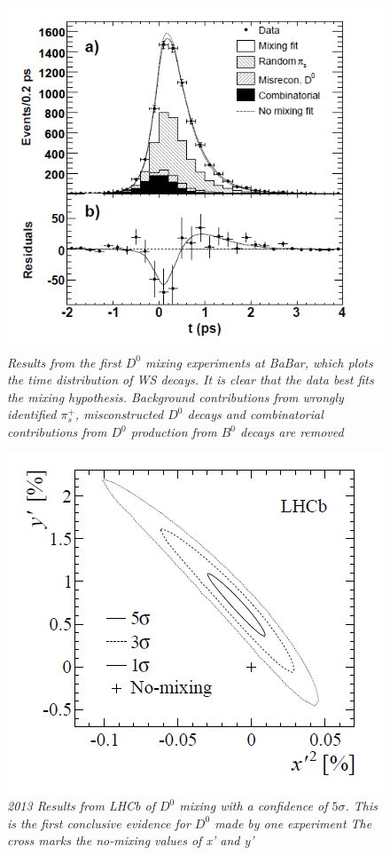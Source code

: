 \begin{figure}[h!]
\begin{center}
\includegraphics[scale=0.4]{figs/BaBar_D0_Mixing_Results.png}
\end{center}
\caption{\textit{Results from the first $D^{0}$ mixing experiments at BaBar, which plots the time distribution of WS decays. It is clear that the data best fits the mixing hypothesis. Background contributions from wrongly identified $\pi^{+}_{s}$, misconstructed $D^{0}$ decays and combinatorial contributions from $D^{0}$ production from $B^{0}$ decays are removed}}
\label{BaBar_D0_Mixing_Results.png}
\end{figure}

\begin{figure}[h!]
\begin{center}
\includegraphics[scale=0.4]{figs/LHCb_D0_Mixing_Results.png}
\end{center}
\caption{\textit{2013 Results from LHCb of $D^{0}$ mixing with a confidence of $5 \sigma$. This is the first conclusive evidence for $D^{0}$ made by one experiment The cross marks the no-mixing values of x' and y'}}
\label{LHCb_D0_Mixing_Results.png}
\end{figure}

